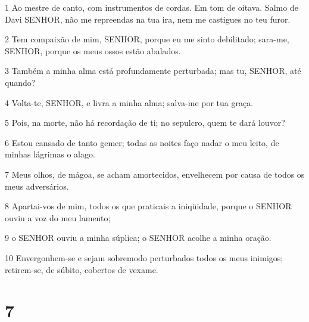 \par 1 Ao mestre de canto, com instrumentos de cordas. Em tom de oitava. Salmo de Davi SENHOR, não me repreendas na tua ira, nem me castigues no teu furor.
\par 2 Tem compaixão de mim, SENHOR, porque eu me sinto debilitado; sara-me, SENHOR, porque os meus ossos estão abalados.
\par 3 Também a minha alma está profundamente perturbada; mas tu, SENHOR, até quando?
\par 4 Volta-te, SENHOR, e livra a minha alma; salva-me por tua graça.
\par 5 Pois, na morte, não há recordação de ti; no sepulcro, quem te dará louvor?
\par 6 Estou cansado de tanto gemer; todas as noites faço nadar o meu leito, de minhas lágrimas o alago.
\par 7 Meus olhos, de mágoa, se acham amortecidos, envelhecem por causa de todos os meus adversários.
\par 8 Apartai-vos de mim, todos os que praticais a iniqüidade, porque o SENHOR ouviu a voz do meu lamento;
\par 9 o SENHOR ouviu a minha súplica; o SENHOR acolhe a minha oração.
\par 10 Envergonhem-se e sejam sobremodo perturbados todos os meus inimigos; retirem-se, de súbito, cobertos de vexame.

\chapter{7}

